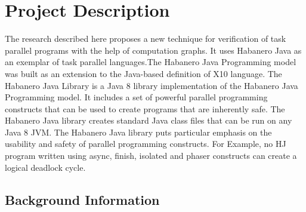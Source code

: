 \section{Project Description}
The research described here proposes a new technique for verification of task parallel programs with the help of computation graphs. It uses Habanero Java as an exemplar of task parallel languages.The Habanero Java Programming model was built as an extension to the Java-based definition of X10 language. The Habanero Java Library is a Java 8 library implementation of the Habanero Java Programming model. It includes a set of powerful parallel programming constructs that can be used to create programs that are inherently safe. The Habanero Java library creates standard Java class files that can be run on any Java 8 JVM. The Habanero Java library puts particular emphasis on the usability and safety of parallel programming constructs. For Example, no HJ program written using async, finish, isolated and phaser constructs can create a logical deadlock cycle.

\subsection{Background Information}

